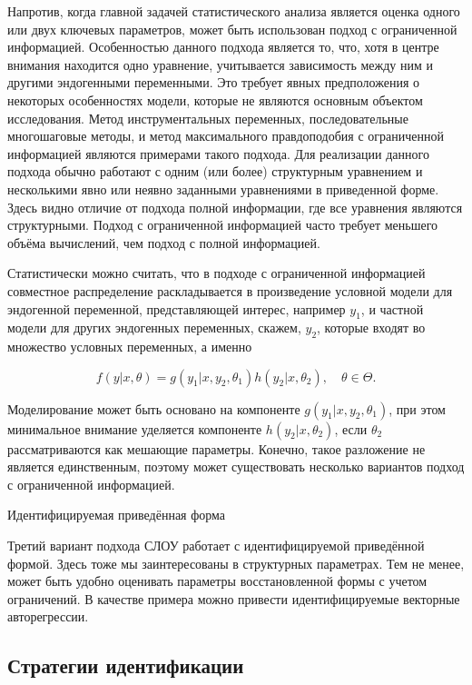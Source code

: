 Напротив, когда главной задачей статистического анализа является оценка одного или двух ключевых параметров, может быть использован подход с ограниченной информацией. 
Особенностью данного подхода является то, что, хотя  в центре внимания находится одно уравнение, учитывается зависимость между ним и другими эндогенными переменными. Это требует явных предположения о некоторых особенностях модели, которые не являются основным объектом исследования. Метод инструментальных переменных, последовательные многошаговые методы, и метод  максимального правдоподобия с ограниченной информацией являются  примерами такого подхода. Для реализации данного подхода обычно работают с одним (или более) структурным уравнением и несколькими явно или неявно заданными уравнениями в приведенной форме. Здесь видно отличие от подхода полной информации, где все уравнения являются структурными. Подход с ограниченной информацией часто требует меньшего объёма вычислений, чем подход с полной информацией.

Статистически можно считать, что в подходе с ограниченной информацией   совместное распределение раскладывается в произведение условной модели для эндогенной переменной, представляющей интерес, например $y_{1}$, и частной модели для других эндогенных переменных, скажем, $y_{2}$, которые входят во множество условных переменных, а именно

\begin{equation}
f(y|x,\theta)=g(y_{1}|x,y_{2},\theta_{1})h(y_{2}|x,\theta_{2}), \quad \theta \in \Theta.
\end{equation}


Моделирование может быть основано на компоненте $g(y_{1}|x,y_{2},\theta_{1})$, при этом минимальное  внимание уделяется компоненте $h(y_{2}|x,\theta_{2})$, если $\theta_{2}$ рассматриваются как мешающие параметры. Конечно, такое разложение не является единственным, поэтому может существовать несколько вариантов подход с ограниченной информацией.


\begin{center}
Идентифицируемая приведённая форма
\end{center}


Третий вариант подхода СЛОУ работает с идентифицируемой приведённой  формой. Здесь тоже мы заинтересованы в структурных параметрах. Тем не менее, может быть удобно оценивать параметры восстановленной формы с учетом ограничений. В качестве примера можно привести идентифицируемые  векторные авторегрессии.


\subsection{Стратегии идентификации}

